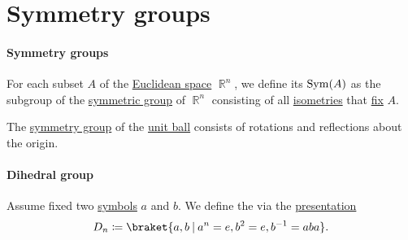 \section{Symmetry groups}\label{sec:symmetry_groups}

\paragraph{Symmetry groups}

\begin{definition}\label{def:symmetry_group}
  For each subset \( A \) of the \hyperref[def:euclidean_space]{Euclidean space} \( \BbbR^n \), we define its  \( \op{Sym}(A) \) as the subgroup of the \hyperref[def:symmetric_group]{symmetric group} of \( \BbbR^n \) consisting of all \hyperref[def:isometry]{isometries} that \hyperref[def:fixed_point]{fix} \( A \).
\end{definition}

\begin{proposition}\label{thm:symmetry_group_of_sphere}
  The \hyperref[def:symmetry_group]{symmetry group} of the \hyperref[def:metric_space/ball]{unit ball} consists of rotations and reflections about the origin.
\end{proposition}

\paragraph{Dihedral group}

\begin{definition}\label{def:dihedral_group}
  Assume fixed two \hyperref[def:formal_language/symbol]{symbols} \( a \) and \( b \). We define the  via the \hyperref[def:group_presentation]{presentation}
  \begin{equation}\label{eq:def:dihedral_group}
    D_n \coloneqq \braket{ a, b \given a^n = e, b^2 = e, b^{-1} = aba }.
  \end{equation}
\end{definition}
